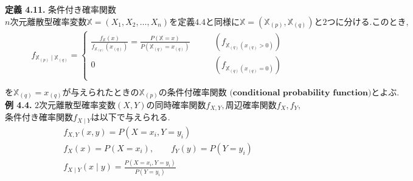 \documentclass[dvipdfmx,10pt, a4j]{jarticle}
\theoremstyle{definition}
\begin{document}
\noindent
\textbf{定義 4.11.} 条件付き確率関数\\
$n次元離散型確率変数 \mathbb{X} = (X_1, X_2, \dots, X_n) を定義4.4と同様に \mathbb{X} = (\mathbb{X}_{(p)}, \mathbb{X}_{(q)})と2つに分ける.このとき,$\\
\begin{align*}
    f_{\mathbb{X}_{(p)} \mid \mathbb{X}_{(q)}} = 
    \begin{cases}
        \frac{f_{\mathbb{X}}(x)}{f_{\mathbb{X}_{(q)}}(x_{(q)})} = \frac{P(\mathbb{X} = x)}{P\left(\mathbb{X}_{(q)} = x_{(q)}\right)} \qquad &\left(f_{\mathbb{X}_{(q)}(x_{(q)} > 0)}\right)\\
        0 \qquad &\left(f_{\mathbb{X}_{(q)}(x_{(q)} = 0)}\right)\\
    \end{cases}\\
\end{align*}
$を\mathbb{X}_{(q)} = x_{(q)} が与えられたときの\mathbb{X}_{(p)} の \textbf{条件付確率関数 (conditional probability function)} とよぶ.$\\

\noindent
\textbf{例 4.4.} $2次元離散型確率変数(X, Y)の同時確率関数f_{X, Y}, 周辺確率関数 f_X, f_Y,$
$条件付き確率関数f_{X \mid Y} は以下で与えられる.$\\
\begin{align*}
    f_{X, Y}(x, y) = P(X = x_i, Y = y_i)\\
    f_X(x) = P(X = x_i), \qquad f_Y(y) = P(Y = y_i)\\
    f_{X \mid Y}(x \mid y) = \frac{P(X = x_i, Y = y_i)}{P(Y = y_i)}\\
\end{align*}
\end{document}
